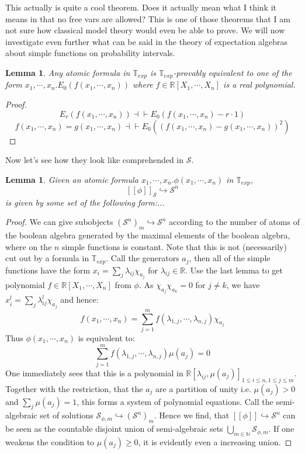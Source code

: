 \documentclass[a4paper]{amsproc}
\theoremstyle{plain}
\newtheorem{lemma}[theorem]{Lemma}
\theoremstyle{definition}
\theoremstyle{remark}
\numberwithin{equation}{section}
\newcommand{\ldoub}{[\![ }
\newcommand{\rdoub}{]\!]}
\begin{document}
This actually is quite a cool theorem. Does it actually mean what I think it means in that no free vars are allowed? This is one of those theorems that I am not sure how classical model theory would even be able to prove.\newline
\indent We will now investigate even further what can be said in the theory of expectation algebras about simple functions on probability intervals.
\begin{lemma} Any atomic formula in $\mathbb{T}_{exp}$ is $\mathbb{T}_{exp}$-provably equivalent to one of the form $x_1,\cdots, x_n. E_0(f(x_1,\cdots,x_n))$ where $f\in \mathbb{R}[X_1,\cdots, X_n]$ is a real polynomial. 
\end{lemma}
\begin{proof}
\[ E_r(f(x_1,\cdots, x_n))\dashv \vdash E_0(f(x_1,\cdots, x_n)-r\cdot 1)    \]
\[ f(x_1,\cdots, x_n)=g(x_1,\cdots ,x_n)\dashv\vdash E_0((f(x_1,\cdots, x_n)-g(x_1,\cdots ,x_n))^2)  \]
\end{proof}
Now let's see how they look like comprehended in $\mathcal{S}$.
\begin{lemma} Given an atomic formula $x_1,\cdots, x_n. \phi(x_1,\cdots, x_n)$ in $\mathbb{T}_{exp}$, 
\[\ldoub \phi \rdoub_\mathcal{S} \hookrightarrow \mathcal{S}^n  \]
is given by some set of the following form:...
\end{lemma}
\begin{proof}
We can give subobjects $(\mathcal{S}^n)_m\hookrightarrow \mathcal{S}^n$ according to the number of atoms of the boolean algebra generated by the maximal elements of the boolean algebra, where on the $n$ simple functions is constant. Note that this is not (necessarily) cut out by a formula in $\mathbb{T}_{exp}$.\newline
\indent Call the generators $a_j$, then all of the simple functions have the form $x_i=\sum_j \lambda_{ij} \chi_{a_j}$ for $\lambda_{ij}\in\mathbb{R}$. Use the last lemma to get polynomial $f\in \mathbb{R}[X_1,\cdots, X_n]$ from $\phi$. As $\chi_{a_j}\chi_{a_k}=0$ for $j\neq k$, we have $x_i^l=\sum_j \lambda_{ij}^l\chi_{a_j} $ and hence:
\[f(x_1,\cdots, x_n) =\sum_{j=1}^m f(\lambda_{1,j},\cdots, \lambda_{n,j})\chi_{a_j}  \] 
Thus $\phi(x_1,\cdots, x_n)$ is equivalent to:
\[ \sum_{j=1}^m f(\lambda_{1,j},\cdots, \lambda_{n,j})\mu(a_j)=0\]
One immediately sees that this is a polynomial in $\mathbb{R}[\lambda_{ij}, \mu(a_j)]_{1\leq i\leq n, 1\leq j \leq m}$. Together with the restriction, that the $a_j$ are a partition of unity i.e. $\mu(a_j)> 0$ and $\sum_j \mu(a_j)=1$, this forms a system of polynomial equations. Call the semi-algebraic set of solutions $\mathcal{S}_{\phi,m}\hookrightarrow (\mathcal{S}^n)_m$. Hence we find, that $\ldoub \phi \rdoub \hookrightarrow \mathcal{S}^n$ can be seen as the countable disjoint union of semi-algebraic sets $\bigcup_{m\in \mathbb{N}} \mathcal{S}_{\phi,m}$. If one weakens the condition to $\mu(a_j)\geq 0$, it is evidently even a increasing union. %
\end{proof}
\end{document}
